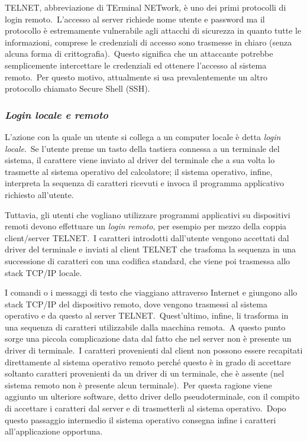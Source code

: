 TELNET, abbreviazione di TErminal NETwork, è uno dei primi protocolli di login remoto.\
L'accesso al server richiede nome utente e password ma il protocollo è estremamente vulnerabile agli attacchi di sicurezza in quanto tutte le informazioni, comprese le credenziali di accesso sono trasmesse in chiaro (senza alcuna forma di crittografia).\
Questo significa che un attaccante potrebbe semplicemente intercettare le credenziali ed ottenere l'accesso al sistema remoto.\
Per questo motivo, attualmente si usa prevalentemente un altro protocollo chiamato Secure Shell (SSH).

\subsubsection{\emph{Login locale e remoto}}

L'azione con la quale un utente si collega a un computer locale è detta \emph{login locale}.\
Se l'utente preme un tasto della tastiera connessa a un terminale del sistema, il carattere viene inviato al driver del terminale che a sua volta lo trasmette al sistema operativo del calcolatore; il sistema operativo, infine, interpreta la sequenza di caratteri ricevuti e invoca il programma applicativo richiesto all'utente.

Tuttavia, gli utenti che vogliano utilizzare programmi applicativi su dispositivi remoti devono effettuare un \emph{login remoto}, per esempio per mezzo della coppia client/server TELNET.\
I caratteri introdotti dall'utente vengono accettati dal driver del terminale e inviati al client TELNET che trasfoma la sequenza in una successione di caratteri con una codifica standard, che viene poi trasmessa allo stack TCP/IP locale.

I comandi o i messaggi di testo che viaggiano attraverso Internet e giungono allo stack TCP/IP del dispositivo remoto, dove vengono trasmessi al sistema operativo e da questo al server TELNET.\
Quest'ultimo, infine, li trasforma in una sequenza di caratteri utilizzabile dalla macchina remota.\
A questo punto sorge una piccola complicazione data dal fatto che nel server non è presente un driver di terminale.\
I caratteri provenienti dal client non possono essere recapitati direttamente al sistema operativo remoto perché questo è in grado di accettare soltanto caratteri provenienti da un driver di un terminale, che è assente (nel sistema remoto non è presente alcun terminale).\
Per questa ragione viene aggiunto un ulteriore software, detto driver dello pseudoterminale, con il compito di accettare i caratteri dal server e di trasmetterli al sistema operativo.\
Dopo questo passaggio intermedio il sistema operativo consegna infine i caratteri all'applicazione opportuna.

